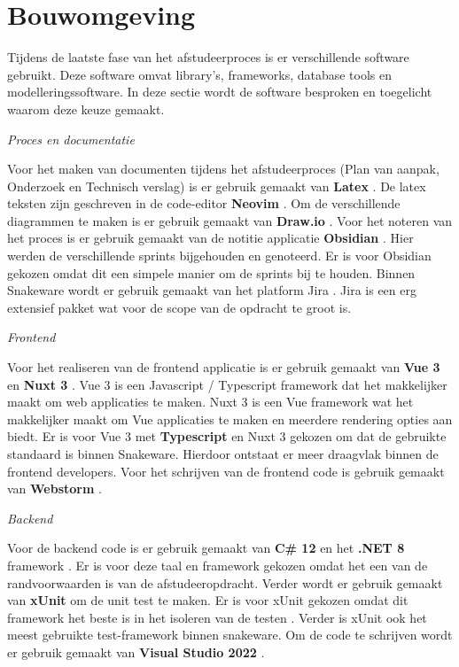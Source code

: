 \section{Bouwomgeving}
Tijdens de laatste fase van het afstudeerproces is er verschillende software gebruikt.
Deze software omvat library's, frameworks, database tools en modelleringssoftware.
In deze sectie wordt de software besproken en toegelicht waarom deze keuze gemaakt.

\whitespace[2]
\textit{Proces en documentatie}

\whitespace[2]
Voor het maken van documenten tijdens het afstudeerproces (Plan van aanpak, Onderzoek en Technisch verslag) is er gebruik gemaakt van \textbf{Latex} \parencite{Latex}.
De latex teksten zijn geschreven in de code-editor \textbf{Neovim} \parencite{NeoVim}.
Om de verschillende diagrammen te maken is er gebruik gemaakt van \textbf{Draw.io} \parencite{Drawio}.
Voor het noteren van het proces is er gebruik gemaakt van de notitie applicatie \textbf{Obsidian} \parencite{Obsidian}.
Hier werden de verschillende sprints bijgehouden en genoteerd.
Er is voor Obsidian gekozen omdat dit een simpele manier om de sprints bij te houden.
Binnen Snakeware wordt er gebruik gemaakt van het platform Jira \parencite{Jira}.
Jira is een erg extensief pakket wat voor de scope van de opdracht te groot is.

\whitespace[2]
\textit{Frontend}

\whitespace[2]
Voor het realiseren van de frontend applicatie is er gebruik gemaakt van \textbf{Vue 3} \parencite{Vue} en \textbf{Nuxt 3} \parencite{Nuxt}.
Vue 3 is een Javascript \parencite{JavaScript} / Typescript \parencite{Typescript} framework dat het makkelijker maakt om web applicaties te maken.
Nuxt 3 is een Vue framework wat het makkelijker maakt om Vue applicaties te maken en meerdere rendering opties aan biedt.
Er is voor Vue 3 met \textbf{Typescript} en Nuxt 3 gekozen om dat de gebruikte standaard is binnen Snakeware.
Hierdoor ontstaat er meer draagvlak binnen de frontend developers.
Voor het schrijven van de frontend code is gebruik gemaakt van \textbf{Webstorm} \parencite{Webstorm}.

\newpage

\whitespace[2]
\textit{Backend}

\whitespace[2]
Voor de backend code is er gebruik gemaakt van \textbf{C\# 12} \parencite{CSharp} en het \textbf{.NET 8} framework \parencite{DotNet8}.
Er is voor deze taal en framework gekozen omdat het een van de randvoorwaarden is van de afstudeeropdracht.
Verder wordt er gebruik gemaakt van \textbf{xUnit} \parencite{xUnit} om de unit test te maken.
Er is voor xUnit gekozen omdat dit framework het beste is in het isoleren van de testen \parencite{IsolationTest}. 
Verder is xUnit ook het meest gebruikte test-framework binnen snakeware.
Om de code te schrijven wordt er gebruik gemaakt van \textbf{Visual Studio 2022} \parencite{VisualStudio}.

